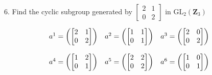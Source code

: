 \newpage
\begin{mdframed}[style=darkQuesion]
  6. Find the cyclic subgroup generated by $\left[\begin{array}{ll}2 & 1 \\ 0 & 2\end{array}\right]$ in $\mathrm{GL}_{2}\left(\mathbf{Z}_{3}\right)$
\end{mdframed}
\begin{mdframed}[style=darkAnswer,frametitle={Joe Starr}]
  $$
\begin{matrix}
a^{ 1 }=\left(\begin{bmatrix}2 & 1 \\ 0 & 2\end{bmatrix}\right)&
a^{ 2 }=\left(\begin{bmatrix} 1 & 1 \\ 0 & 1 \end{bmatrix}\right)&
a^{ 3 }=\left(\begin{bmatrix} 2 & 0 \\ 0 & 2 \end{bmatrix}\right)\\ \hspace{.5in} \\
a^{ 4 }=\left(\begin{bmatrix} 1 & 2 \\ 0 & 1 \end{bmatrix}\right)&
a^{ 5 }=\left(\begin{bmatrix} 2 & 2 \\ 0 & 2 \end{bmatrix}\right)&
a^{ 6 }=\left(\begin{bmatrix} 1 & 0 \\ 0 & 1 \end{bmatrix}\right)&
\end{matrix}
$$
\end{mdframed}
\newpage
